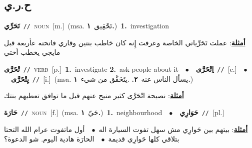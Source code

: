 \documentclass[10pt,a4paper,twoside]{article} %
\begin{document}
\begin{multicols}{2}
\vspace{-3mm}
\subsection*{\color{blue}\foreignlanguage{arabic}{ح.ر.ي}\color{blue}{}} 

{\setlength\topsep{0pt}\textbf{\foreignlanguage{arabic}{تَحَرِّي}}\ {\color{gray}\texttt{//}\color{black}}\ \textsc{noun}\ [m.]\ \color{gray}(msa. \foreignlanguage{arabic}{تَحْقِيق}~\foreignlanguage{arabic}{\textbf{١.}})\color{black}\ \textbf{1.}~investigation\  \begin{flushright}\color{gray}\foreignlanguage{arabic}{\textbf{\underline{\foreignlanguage{arabic}{أمثلة}}}: عملت تَحَرِّياتي الخاصة وعرفت إِنه كان خاطب بنتين وقاري فاتحته عأربعة قبل مايجي يخطب أختي}\end{flushright}\color{black}} \vspace{2mm}

{\setlength\topsep{0pt}\textbf{\foreignlanguage{arabic}{تْحَرَّى}}\ {\color{gray}\texttt{//}\color{black}}\ \textsc{verb}\ [p.]\ \textbf{1.}~investigate  \textbf{2.}~ask people about it\ \ $\bullet$\ \ \setlength\topsep{0pt}\textbf{\foreignlanguage{arabic}{اِتْحَرَّى}}\ {\color{gray}\texttt{//}\color{black}}\ [c.]\ \ $\bullet$\ \ \setlength\topsep{0pt}\textbf{\foreignlanguage{arabic}{يِتْحَرَّى}}\ {\color{gray}\texttt{//}\color{black}}\ [i.]\ \color{gray}(msa. \foreignlanguage{arabic}{يسأل الناس عنه}~\foreignlanguage{arabic}{\textbf{٢.}}  .\foreignlanguage{arabic}{يتَحَقَّق من شيء}~\foreignlanguage{arabic}{\textbf{١.}})\color{black}\  \begin{flushright}\color{gray}\foreignlanguage{arabic}{\textbf{\underline{\foreignlanguage{arabic}{أمثلة}}}: نصيحة اتْحَرَّى كثير منيح عنهم قبل ما توافق تعطيهم بنتك}\end{flushright}\color{black}} \vspace{2mm}

{\setlength\topsep{0pt}\textbf{\foreignlanguage{arabic}{حَارَة}}\ {\color{gray}\texttt{//}\color{black}}\ \textsc{noun}\ [f.]\ \color{gray}(msa. \foreignlanguage{arabic}{حَيّ}~\foreignlanguage{arabic}{\textbf{١.}})\color{black}\ \textbf{1.}~neighbourhood\ \ $\bullet$\ \ \setlength\topsep{0pt}\textbf{\foreignlanguage{arabic}{حَوَارِي}}\ {\color{gray}\texttt{//}\color{black}}\ [pl.]\  \begin{flushright}\color{gray}\foreignlanguage{arabic}{\textbf{\underline{\foreignlanguage{arabic}{أمثلة}}}: بيتهم بين حَوارِي مش سهل تفوت السيارة اله\ $\bullet$\ \  أول ماتفوت عرام الله التحتا بتلاقي كلها حَوارِي قديمة\ $\bullet$\ \  الحارَة هادية اليوم. شو الدعوة؟}\end{flushright}\color{black}} \vspace{2mm}


\end{multicols}
\end{document}
